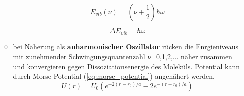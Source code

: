 \begin{itemize}
\begin{itemize}
                \begin{equation}
                    E_{vib}(\nu)=(\nu+\frac{1}{2})\hbar \omega
                \label{EVib_harmonisch}
                \end{equation}

                \begin{equation}
                \Delta E_{vib}=\hbar \omega
                \label{EVib_Abstaende}
                \end{equation}

            \item bei Näherung als \textbf{anharmonischer Oszillator} rücken die Enrgieniveaus mit zunehmender Schwingungsquantenzahl $\nu$=0,1,2,... näher zusammen und konvergieren gegen Dissoziationsenergie des Moleküls. Potential kann durch Morse-Potential (\autoref{eq:morse_potential}) angenähert werden.
            \begin{equation}
                \label{eq:morse_potential}
                U(r) = U_0 \left( e^{-2(r-r_0)/a} - 2e^{-(r-r_0)/a} \right)
            \end{equation}
        \end{itemize}

\end{itemize}


